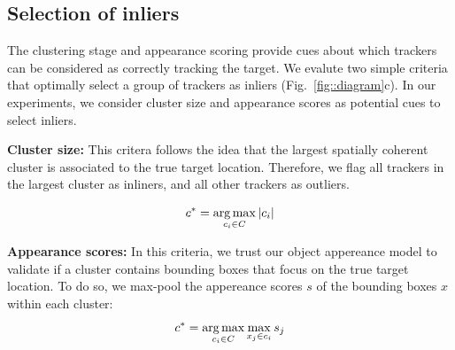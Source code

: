 \subsection{Selection of inliers}
\label{sec:inliers}
The clustering stage and appearance scoring provide cues about which trackers
can be considered as correctly tracking the target.
We evalute two simple criteria that optimally select a group of trackers as
inliers (Fig.~\ref{fig::diagram}c).
In our experiments, we consider cluster size and appearance scores as
potential cues to select inliers.


\textbf{Cluster size:}
This critera follows the idea that the largest spatially coherent cluster
is associated to the true target location. Therefore, we flag all trackers
in the largest cluster as inliners, and all other trackers as outliers.

\begin{equation}
 c^{*} = \operatorname*{arg\,max}_{c_i\in C} |c_i|
\end{equation}


\textbf{Appearance scores:}
In this criteria, we trust our object appereance model to validate if a cluster
contains bounding boxes that focus on the true target location.
To do so, we max-pool the appereance scores $s$ of the bounding boxes $x$ within
each cluster:
\begin{equation}
 c^{*} = \operatorname*{arg\,max}_{c_i\in C} \max_{x_j \in c_i} s_{j}
\end{equation}

